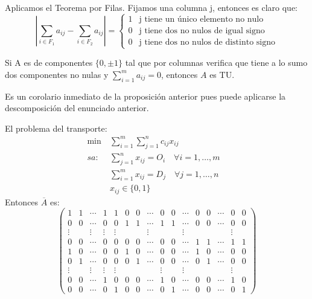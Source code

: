 \documentclass[PM.tex]{subfiles}
\begin{document}
\begin{dem}
Aplicamos el Teorema por Filas. Fijamos una columna j, entonces es claro que:
\[
\left| \sum_{i\in F_1}a_{ij}-\sum_{i\in F_2}a_{ij} \right| =
\begin{cases}
1 & \text{j tiene un único elemento no nulo}\\
0 & \text{j tiene dos no nulos de igual signo}\\
0 & \text{j tiene dos no nulos de distinto signo}
\end{cases}
\]
\end{dem}
\begin{prop}
Si A es de componentes $\{0,\pm1\}$ tal que por columnas verifica que tiene a lo sumo dos componentes no nulas y $\sum_{i=1}^m a_{ij}=0$, entonces $A$ es TU.
\end{prop}
\begin{dem}
Es un corolario inmediato de la proposición anterior pues puede aplicarse la descomposición del enunciado anterior.
\end{dem}
\begin{example}
El problema del transporte:
\begin{align*}
 \min\ & \sum_{i=1}^m\sum_{j=1}^n c_{ij}x_{ij} &\\
sa:& \sum_{j=1}^n x_{ij}= O_i \quad\forall i =1,\dots, m & \\
& \sum_{i=1}^m x_{ij}= D_j \quad \forall j =1,\dots,n &   \\
& x_{ij}\in\{0,1\} &
\end{align*}
Entonces $\overline{A}$ es:
\[\left(
\begin{array}{cccccccccccccccc}
1 & 1 & \cdots & 1 & 1 & 0 & 0 &\cdots  		& 0 & 0 & \cdots & 0 & 0 &  \cdots 	& 0 	& 0\\
0 &	0 & \cdots & 0 & 0 & 1 & 1 & \cdots 		& 1 & 1 & \cdots & 0 & 0 & \cdots 	& 0 	& 0\\
\vdots & &\vdots & \vdots &\vdots & & &\vdots 	&   &   &\vdots & & \ 				&   	& \vdots\\
0 & 0 & \cdots & 0 & 0 & 0 & 0 & \cdots			& 0 & 0 & \cdots & 1 & 1 & \cdots 	& 1 	& 1\\
1 & 0 & \cdots & 0 & 0 & 1 & 0& \cdots 			& 0 & 0 & \cdots  & 1 & 0 & \cdots 	& 0 	& 0 \\
0 & 1 & \cdots & 0 & 0 & 0 & 1& \cdots 			& 0 & 0 & \cdots  & 0 & 1 & \cdots 	& 0 	& 0 \\
\vdots & &\vdots & \vdots &\vdots 				&   &    & &\vdots & &\vdots &   &  &    	& \vdots\\
0 & 0 & \cdots & 1 & 0 & 0 & 0& \cdots 			& 1 & 0 & \cdots  & 0 & 0 & \cdots 	& 1 	& 0\\
0 & 0 & \cdots & 0 & 1 & 0 & 0& \cdots 			& 0 & 1 & \cdots  & 0 & 0 & \cdots 	& 0 	& 1
\end{array}\right)
\]
\end{example}
\end{document}
